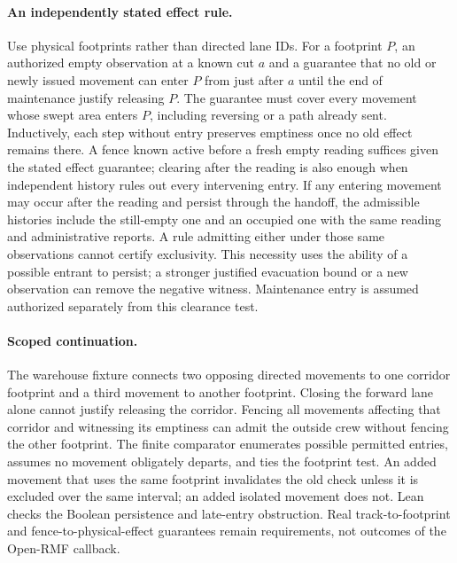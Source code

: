 \documentclass{article}
\begin{document}
\paragraph{An independently stated effect rule.}
Use physical footprints rather than directed lane IDs. For a footprint $P$,
an authorized empty observation at a known cut $a$ and a guarantee that no old
or newly issued movement can enter $P$ from just after $a$ until the end of
maintenance justify releasing $P$. The guarantee must cover every movement
whose swept area enters $P$, including reversing or a path already sent.
Inductively, each step without entry preserves emptiness once no old effect
remains there. A fence known active before a fresh empty reading suffices given
the stated effect guarantee; clearing after the reading is also enough when
independent history rules out every intervening entry. If any entering
movement may occur after the reading and persist through the handoff, the
admissible histories include the still-empty one and an occupied one with the
same reading and administrative reports. A rule admitting either under those
same observations cannot certify exclusivity. This necessity uses the ability
of a possible entrant to persist; a stronger justified evacuation bound or a
new observation can remove the negative witness. Maintenance entry is assumed
authorized separately from this clearance test.

\paragraph{Scoped continuation.}
The warehouse fixture connects two opposing directed movements to one
corridor footprint and a third movement to another footprint. Closing the
forward lane alone cannot justify releasing the corridor. Fencing all
movements affecting that corridor and witnessing its emptiness can admit the
outside crew without fencing the other footprint. The finite comparator
enumerates possible permitted entries, assumes no movement obligately
departs, and ties the footprint test. An added movement that uses the same
footprint invalidates the old check unless it is excluded over the same
interval; an added isolated movement does not. Lean checks the Boolean
persistence and late-entry obstruction. Real track-to-footprint and
fence-to-physical-effect guarantees remain requirements, not outcomes of
the Open-RMF callback.
\end{document}
